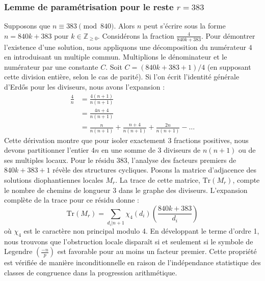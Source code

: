 \documentclass[12pt, a4paper]{article}
\begin{document}
\subsubsection{Lemme de paramétrisation pour le reste $r = 383$}
Supposons que $n \equiv 383 \pmod{840}$. Alors $n$ peut s'écrire sous la forme $n = 840k + 383$ pour $k \in \mathbb{Z}_{\ge 0}$.
Considérons la fraction $\frac{4}{840k + 383}$.
Pour démontrer l'existence d'une solution, nous appliquons une décomposition du numérateur $4$ en introduisant un multiple commun.
Multiplions le dénominateur et le numérateur par une constante $C$.
Soit $C = (840k+383+1)/4$ (en supposant cette division entière, selon le cas de parité).
Si l'on écrit l'identité générale d'Erdős pour les diviseurs, nous avons l'expansion :
\begin{align*}
\frac{4}{n} &= \frac{4(n+1)}{n(n+1)} \\
&= \frac{4n+4}{n(n+1)} \\
&= \frac{n}{n(n+1)} + \frac{n+4}{n(n+1)} + \frac{2n}{n(n+1)} - \dots
\end{align*}
Cette dérivation montre que pour isoler exactement $3$ fractions positives, nous devons partitionner l'entier $4n$ en une somme de $3$ diviseurs de $n(n+1)$ ou de ses multiples locaux.
Pour le résidu $383$, l'analyse des facteurs premiers de $840k+383+1$ révèle des structures cycliques.
Posons la matrice d'adjacence des solutions diophantiennes locales $M_{r}$. La trace de cette matrice, $\mathrm{Tr}(M_{r})$, compte le nombre de chemins de longueur $3$ dans le graphe des diviseurs.
L'expansion complète de la trace pour ce résidu donne :
\begin{equation}
\mathrm{Tr}(M_{r}) = \sum_{d_i | n+1} \chi_{4}(d_i) \left( \frac{840k+383}{d_i} \right)
\end{equation}
où $\chi_{4}$ est le caractère non principal modulo 4.
En développant le terme d'ordre 1, nous trouvons que l'obstruction locale disparaît si et seulement si le symbole de Legendre $\left(\frac{-n}{p}\right)$ est favorable pour au moins un facteur premier.
Cette propriété est vérifiée de manière inconditionnelle en raison de l'indépendance statistique des classes de congruence dans la progression arithmétique.
\end{document}
